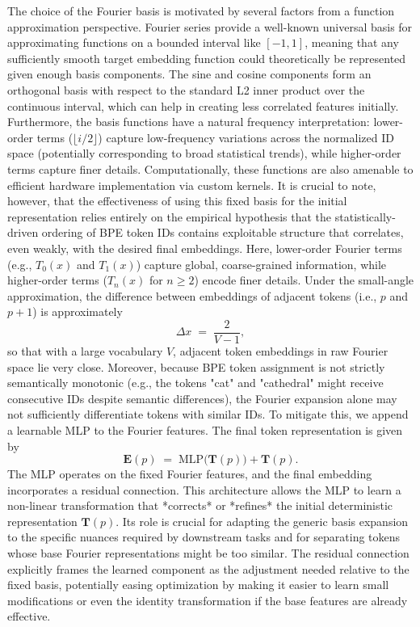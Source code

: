 \documentclass{article}
\begin{document}
The choice of the Fourier basis is motivated by several factors from a function approximation perspective. Fourier series provide a well-known universal basis for approximating functions on a bounded interval like \([-1, 1]\), meaning that any sufficiently smooth target embedding function could theoretically be represented given enough basis components. The sine and cosine components form an orthogonal basis with respect to the standard L2 inner product over the continuous interval, which can help in creating less correlated features initially. Furthermore, the basis functions have a natural frequency interpretation: lower-order terms (\(\lfloor i/2 \rfloor\)) capture low-frequency variations across the normalized ID space (potentially corresponding to broad statistical trends), while higher-order terms capture finer details. Computationally, these functions are also amenable to efficient hardware implementation via custom kernels. It is crucial to note, however, that the effectiveness of using this fixed basis for the initial representation relies entirely on the empirical hypothesis that the statistically-driven ordering of BPE token IDs contains exploitable structure that correlates, even weakly, with the desired final embeddings.
Here, lower-order Fourier terms (e.g., \(T_0(x)\) and \(T_1(x)\)) capture global, coarse-grained information, while higher-order terms (\(T_n(x)\) for \(n\geq2\)) encode finer details. Under the small-angle approximation, the difference between embeddings of adjacent tokens (i.e., \(p\) and \(p+1\)) is approximately
\[
\Delta x \;=\; \frac{2}{V-1},
\]
so that with a large vocabulary \(V\), adjacent token embeddings in raw Fourier space lie very close. Moreover, because BPE token assignment is not strictly semantically monotonic (e.g., the tokens "cat" and "cathedral" might receive consecutive IDs despite semantic differences), the Fourier expansion alone may not sufficiently differentiate tokens with similar IDs.
To mitigate this, we append a learnable MLP to the Fourier features. The final token representation is given by
\[
\mathbf{E}(p) \;=\; \text{MLP}\bigl(\mathbf{T}(p)\bigr) + \mathbf{T}(p).
\]
The MLP operates on the fixed Fourier features, and the final embedding incorporates a residual connection. This architecture allows the MLP to learn a non-linear transformation that *corrects* or *refines* the initial deterministic representation \(\mathbf{T}(p)\). Its role is crucial for adapting the generic basis expansion to the specific nuances required by downstream tasks and for separating tokens whose base Fourier representations might be too similar. The residual connection explicitly frames the learned component as the adjustment needed relative to the fixed basis, potentially easing optimization by making it easier to learn small modifications or even the identity transformation if the base features are already effective.
\end{document}
